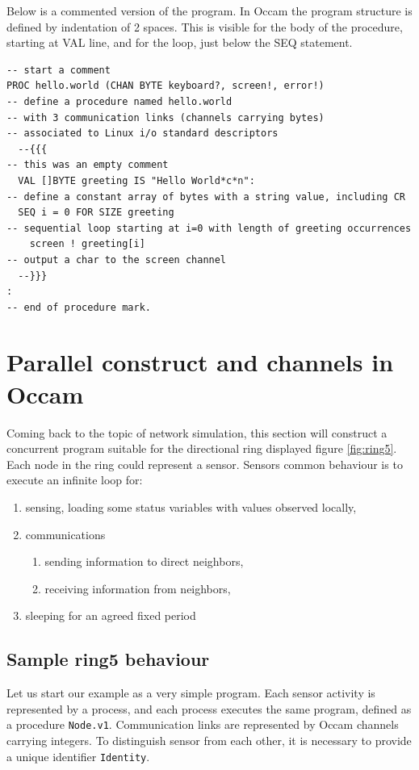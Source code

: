 \documentclass[times,a4paper]{book}
\begin{document}
Below is a commented version of the program. In Occam
the program structure is defined by indentation of 2 spaces. This
is visible for the body of the procedure, starting at VAL line,
and for the loop, just below the SEQ statement.

\begin{lstlisting}  
-- start a comment
PROC hello.world (CHAN BYTE keyboard?, screen!, error!)
-- define a procedure named hello.world
-- with 3 communication links (channels carrying bytes) 
-- associated to Linux i/o standard descriptors
  --{{{
-- this was an empty comment
  VAL []BYTE greeting IS "Hello World*c*n":
-- define a constant array of bytes with a string value, including CR
  SEQ i = 0 FOR SIZE greeting
-- sequential loop starting at i=0 with length of greeting occurrences
    screen ! greeting[i]
-- output a char to the screen channel
  --}}}
:
-- end of procedure mark.
\end{lstlisting} 


\section{Parallel construct and channels in Occam}

Coming back to the topic of network simulation, this section will construct
a concurrent program suitable for the directional ring displayed figure \ref{fig:ring5}.
Each node in the ring could represent a sensor. Sensors common behaviour is to execute
an infinite loop for:
\begin{enumerate}
\item sensing, loading some status variables with values observed locally,
\item communications
\begin{enumerate}
\item sending information to direct neighbors,
\item receiving information from neighbors,
\end{enumerate}
\item sleeping for an agreed fixed period
\end{enumerate}

\subsection {Sample ring5 behaviour }

Let us start our example as a very simple program. Each sensor activity is represented
by a process, and each process executes the same program, defined as a procedure
{\tt Node.v1}. Communication links are represented by Occam channels carrying integers.
To distinguish sensor from each other, it is necessary to provide a unique identifier {\tt Identity}.
\end{document}
